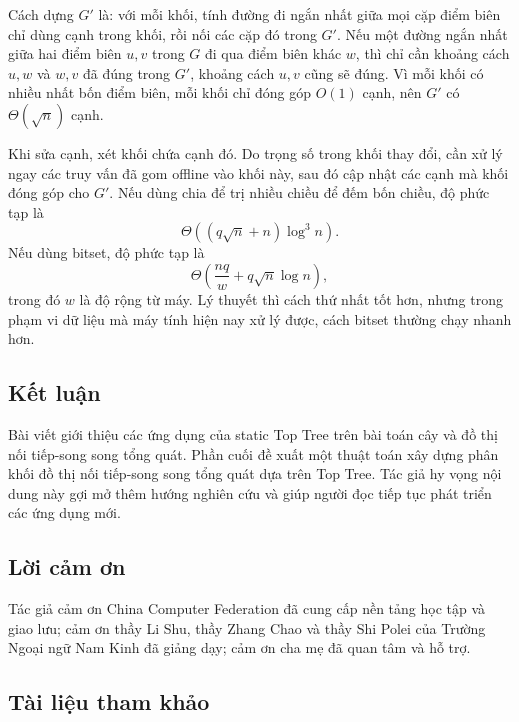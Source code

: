 \documentclass[11pt]{article}
\begin{document}
Cách dựng \(G'\) là: với mỗi khối, tính đường đi ngắn nhất giữa mọi cặp điểm
biên chỉ dùng cạnh trong khối, rồi nối các cặp đó trong \(G'\). Nếu một đường
ngắn nhất giữa hai điểm biên \(u,v\) trong \(G\) đi qua điểm biên khác \(w\),
thì chỉ cần khoảng cách \(u,w\) và \(w,v\) đã đúng trong \(G'\), khoảng cách
\(u,v\) cũng sẽ đúng. Vì mỗi khối có nhiều nhất bốn điểm biên, mỗi khối chỉ
đóng góp \(O(1)\) cạnh, nên \(G'\) có \(\Theta(\sqrt n)\) cạnh.

Khi sửa cạnh, xét khối chứa cạnh đó. Do trọng số trong khối thay đổi, cần xử
lý ngay các truy vấn đã gom offline vào khối này, sau đó cập nhật các cạnh mà
khối đóng góp cho \(G'\). Nếu dùng chia để trị nhiều chiều để đếm bốn chiều,
độ phức tạp là
\[
  \Theta((q\sqrt n+n)\log^3 n).
\]
Nếu dùng bitset, độ phức tạp là
\[
  \Theta\left(\frac{nq}{w}+q\sqrt n\log n\right),
\]
trong đó \(w\) là độ rộng từ máy. Lý thuyết thì cách thứ nhất tốt hơn, nhưng
trong phạm vi dữ liệu mà máy tính hiện nay xử lý được, cách bitset thường chạy
nhanh hơn.

\subsection{Kết luận}

Bài viết giới thiệu các ứng dụng của static Top Tree trên bài toán cây và đồ
thị nối tiếp-song song tổng quát. Phần cuối đề xuất một thuật toán xây dựng
phân khối đồ thị nối tiếp-song song tổng quát dựa trên Top Tree. Tác giả hy
vọng nội dung này gợi mở thêm hướng nghiên cứu và giúp người đọc tiếp tục phát
triển các ứng dụng mới.

\subsection{Lời cảm ơn}

Tác giả cảm ơn China Computer Federation đã cung cấp nền tảng học tập và giao
lưu; cảm ơn thầy Li Shu, thầy Zhang Chao và thầy Shi Polei của Trường Ngoại
ngữ Nam Kinh đã giảng dạy; cảm ơn cha mẹ đã quan tâm và hỗ trợ.

\subsection{Tài liệu tham khảo}
\end{document}
